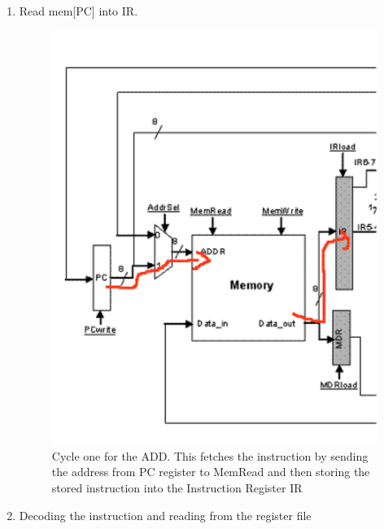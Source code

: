 \documentclass[../notes.tex]{subfiles}
\begin{document}
\begin{enumerate}
	\item Read mem[PC] into IR.

\begin{figure}[H]
	\centering
	\includegraphics[width=0.8\linewidth]{img/image_2022-11-03-13-24-33.png}
	\caption{Cycle one for the ADD. This fetches the instruction by sending the address from PC register to MemRead and then storing the stored instruction into the Instruction Register IR}
\end{figure}

\item Decoding the instruction and reading from the register file



\end{enumerate}
\end{document}
